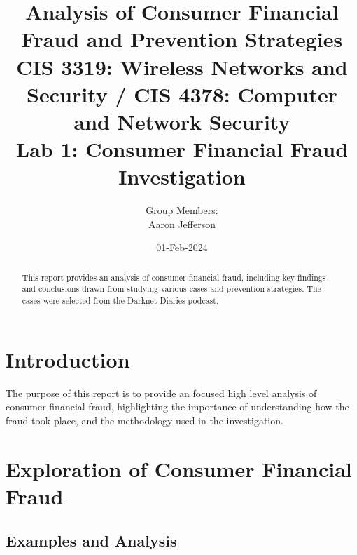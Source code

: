 \documentclass[11pt]{article}
\title{Analysis of Consumer Financial Fraud and Prevention Strategies \\
\large CIS 3319: Wireless Networks and Security / CIS 4378: Computer and Network Security \\
\large Lab 1: Consumer Financial Fraud Investigation}
\author{Group Members: \\ Aaron Jefferson \\ }
\date{01-Feb-2024}
\begin{document}
\maketitle

\begin{abstract}
\noindent This report provides an analysis of consumer financial fraud, including key findings and conclusions drawn from studying various cases and prevention strategies. The cases were selected from the Darknet Diaries podcast. 
\end{abstract}

\tableofcontents

\section{Introduction}
The purpose of this report is to provide an focused high level analysis of consumer financial fraud, highlighting the importance of understanding how the fraud took place, and the methodology used in the investigation.

\section{Exploration of Consumer Financial Fraud}
\subsection{Examples and Analysis}
\end{document}
